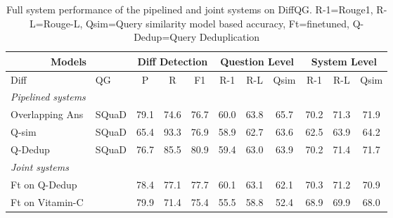 \begin{table*}[ht!]
\begin{center}

\begin{tabular}{ll|ccc|ccc|ccc}
\multicolumn{2}{c|}{Models} & \multicolumn{3}{c|}{Diff Detection} & \multicolumn{3}{c|}{Question Level} & \multicolumn{3}{c}{System Level} \\
\midrule
Diff & QG & P & R & F1 & R-1 & R-L & Qsim & R-1 & R-L & Qsim \\
\midrule
\emph{Pipelined systems} & \\
Overlapping Ans & SQuaD & 79.1 & 74.6 & 76.7 & 60.0 & 63.8 & 65.7 & 70.2 & 71.3 & 71.9 \\
Q-sim & SQuaD & 65.4 & 93.3 & 76.9 & 58.9 & 62.7 & 63.6 & 62.5 & 63.9 & 64.2 \\
Q-Dedup & SQuaD & 76.7 & 85.5 & 80.9 & 59.4 & 63.0 & 63.9 & 70.2 & 71.4 & 71.7 \\
\midrule
\emph{Joint systems} & \\
\multicolumn{2}{l|}{Ft on Q-Dedup} & 78.4 & 77.1 & 77.7 & 60.1 & 63.1 & 62.1 & 70.3 & 71.2 & 70.9 \\
\multicolumn{2}{l|}{Ft on Vitamin-C} & 79.9 & 71.4 & 75.4 & 55.5 & 58.8	& 52.4 & 68.9 & 69.9 & 68.0 \\
\bottomrule
\end{tabular}

\caption{Full system performance of the pipelined and joint systems on DiffQG. R-1=Rouge1, R-L=Rouge-L, Qsim=Query similarity model based accuracy, Ft=finetuned, Q-Dedup=Query Deduplication}
\label{tab:overall}

\end{center}
\end{table*}
